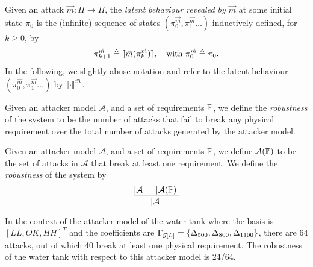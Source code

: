 {{\begin{definition}
  \label{def:LatentBehaviour}
  Given an attack $\vec{m}\colon \Pi\rightarrow \Pi$, the \emph{latent behaviour revealed by $\vec{m}$} at some initial state $\pi_0$ is the (infinite) sequence of states $(\pi^{\vec{m}}_0, \pi^{\vec{m}}_1\ldots)$ inductively defined, for $k\geq 0$, by 
  \begin{align}
    \label{eq:newkCycle}
    {\pi}^{\vec{m}}_{k+1}\triangleq {{\llbracket\vec{m}({\pi}^{\vec{m}}_{k})\rrbracket}}, \quad \text{with ${\pi^{\vec{m}}_{0}}\triangleq \pi_0$.}
  \end{align}
In the following, we slightly abuse notation and refer to the latent behaviour $(\pi^{\vec{m}}_0, \pi^{\vec{m}}_1\ldots)$ by ${{{\llbracket\cdot\rrbracket}}}^{\vec{m}}$.
\end{definition}
Given an attacker model $\mathcal{A}$, and a set of requirements $\mathbb{P}$, we define the \emph{robustness} of the system to be the number of attacks that fail to break any physical requirement over the total number of attacks generated by the attacker model.

\begin{definition}[Robustness]
  \label{def:Robustness}
  Given an attacker model $\mathcal{A}$, and a set of requirements $\mathbb{P}$, we define $\mathcal{A}(\mathbb{P})$ to be the set of attacks in $\mathcal{A}$ that break at least one requirement. We define 
  the \emph{robustness} of the system by 
  \begin{align*}
    \frac{|\mathcal{A}|-|\mathcal{A}(\mathbb{P})|}{|\mathcal{A}|}
  \end{align*}
\end{definition}

\begin{example}
  In the context of the attacker model of the water tank where the basis is $[LL, OK, HH]^T$ and the coefficients are $\Gamma_{\vec{y}[L]}=\left\{{\Delta}_{500}, {\Delta}_{800},  {\Delta}_{1100}\right\}$, there are 64 attacks, out of which 40 break at least one physical requirement. The robustness of the water tank with respect to this attacker model is 24/64.
\end{example}
}}
